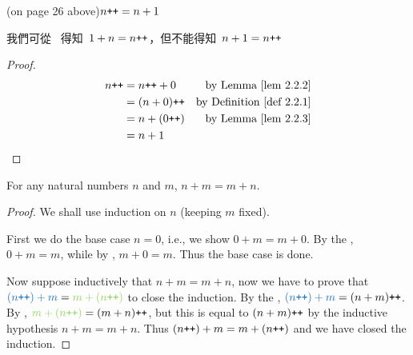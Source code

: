 \begin{additional corollary}\label{ac 2.2.2}(on page 26 above)\(n\texttt{++} = n +1\)
\begin{note}
我們可從\  得知\ \(1 + n = n\texttt{++}\)，但不能得知\ \(n + 1 = n\texttt{++}\)
\end{note}
\begin{proof}
    \begin{align*}
        n\INC & = n\INC + 0 & \text{by \LEM{2.2.2}} \\
              & = (n + 0)\INC & \text{by \DEF{2.2.1}} \\
              & = n + (0\INC) & \text{by \LEM{2.2.3}} \\
              & = n + 1
    \end{align*}
\end{proof}
\end{additional corollary}

\begin{proposition}\label{prop 2.2.4} For any natural numbers \(n\) and \(m\), \(n + m = m + n\).
\end{proposition}
\begin{proof}
We shall use induction on \(n\) (keeping \(m\) fixed).

First we do the base case \(n = 0\), i.e., we show \(0 + m = m + 0\). By the , \(0 + m = m\), while by , \(m + 0 = m\). Thus the base case is done.

Now suppose inductively that \(n + m = m + n\), now we have to prove that \(\BLUE{(n\INC) + m} = \GREEN{m +(n\INC)}\) to close the induction. By the , \(\BLUE{(n\INC) + m} = (n + m)\INC\). By , \(\GREEN{m + (n\INC)} = (m + n)\INC\), but this is equal to \((n + m)\texttt{++}\) by the inductive hypothesis \(n + m = m + n\). Thus \((n\texttt{++}) + m = m +(n\texttt{++})\) and we have closed the induction.
\end{proof}

